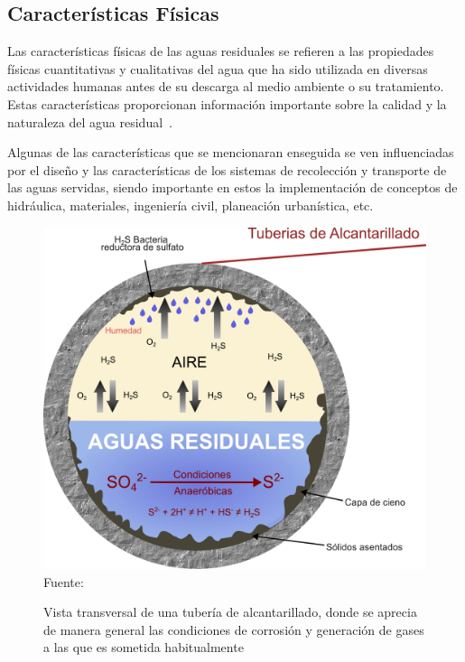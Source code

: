 \subsection{Características Físicas}
Las características físicas de las aguas residuales se refieren a las propiedades físicas cuantitativas y cualitativas del agua que ha sido utilizada en diversas actividades humanas antes de su descarga al medio ambiente o su tratamiento. Estas características proporcionan información importante sobre la calidad y la naturaleza del agua residual~\citep{metcalf2003}.\par
Algunas de las características que se mencionaran enseguida se ven influenciadas por el diseño y las características de los sistemas de recolección y transporte de las aguas servidas, siendo importante en estos la implementación de conceptos de hidráulica, materiales, ingeniería civil, planeación urbanística, etc.\par
\begin{figure}[H]
	\centering
	\includegraphics[scale=0.25]{../Images/Tuberia.pdf}
	\\\small{Fuente: \cite{MSASA}}
	\caption{Vista transversal de una tubería de alcantarillado, donde se aprecia de manera general las condiciones de corrosión y generación de gases a las que es sometida habitualmente}\label{fig:tba}
\end{figure}
